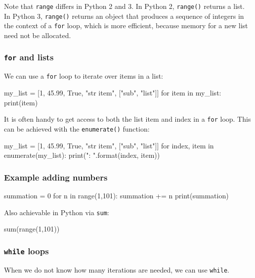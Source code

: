 \documentclass[12pt]{article} \newif\ifsolution\solutiontrue %
\begin{document}
Note that \texttt{range} differs in Python 2 and 3. In Python 2,
\texttt{range()} returns a list. In Python 3, \texttt{range()} returns
an object that produces a sequence of integers in the context of a
\texttt{for} loop, which is more efficient, because memory for a new
list need not be allocated.

\subsubsection{\texorpdfstring{\texttt{for} and
lists}{for and lists}}\label{for-and-lists}

We can use a \texttt{for} loop to iterate over items in a list:

\begin{python}
my_list = [1, 45.99, True, "str item", ["sub", "list"]] for item in my_list:     print(item)
\end{python}

It is often handy to get access to both the list item and index in a
\texttt{for} loop. This can be achieved with the \texttt{enumerate()}
function:

\begin{python}
my_list = [1, 45.99, True, "str item", ["sub", "list"]] for index, item in enumerate(my_list):     print("{}: {}".format(index, item))
\end{python}

\subsubsection{Example adding numbers}\label{example-adding-numbers}

\begin{python}
summation = 0 for n in range(1,101):     summation += n print(summation)
\end{python}

Also achievable in Python via \texttt{sum}:

\begin{python}
sum(range(1,101))
\end{python}

\subsubsection{\texorpdfstring{\texttt{while}
loops}{while loops}}\label{while-loops}

When we do not know how many iterations are needed, we can use
\texttt{while}.
\end{document}
